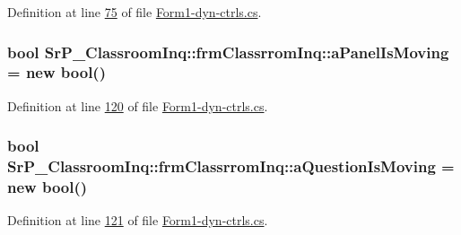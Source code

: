 \-Definition at line \hyperlink{_form1-dyn-ctrls_8cs_source_l00075}{75} of file \hyperlink{_form1-dyn-ctrls_8cs_source}{\-Form1-\/dyn-\/ctrls.\-cs}.

\hypertarget{class_sr_p___classroom_inq_1_1frm_classrrom_inq_ac17e540d0c6f7127a478c861290c883c}{
\subsubsection[{a\-Panel\-Is\-Moving}]{\setlength{\rightskip}{0pt plus 5cm}bool {\bf \-Sr\-P\-\_\-\-Classroom\-Inq\-::frm\-Classrrom\-Inq\-::a\-Panel\-Is\-Moving} = new bool()}}
\label{class_sr_p___classroom_inq_1_1frm_classrrom_inq_ac17e540d0c6f7127a478c861290c883c}


\-Definition at line \hyperlink{_form1-dyn-ctrls_8cs_source_l00120}{120} of file \hyperlink{_form1-dyn-ctrls_8cs_source}{\-Form1-\/dyn-\/ctrls.\-cs}.

\hypertarget{class_sr_p___classroom_inq_1_1frm_classrrom_inq_a0dfd1fb64c081a1cb412164b6eabf30b}{
\subsubsection[{a\-Question\-Is\-Moving}]{\setlength{\rightskip}{0pt plus 5cm}bool {\bf \-Sr\-P\-\_\-\-Classroom\-Inq\-::frm\-Classrrom\-Inq\-::a\-Question\-Is\-Moving} = new bool()}}
\label{class_sr_p___classroom_inq_1_1frm_classrrom_inq_a0dfd1fb64c081a1cb412164b6eabf30b}


\-Definition at line \hyperlink{_form1-dyn-ctrls_8cs_source_l00121}{121} of file \hyperlink{_form1-dyn-ctrls_8cs_source}{\-Form1-\/dyn-\/ctrls.\-cs}.


